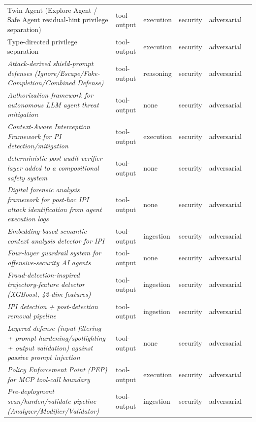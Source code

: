 \begin{longtable}{@{}>{\raggedright\arraybackslash}p{}lllll@{}}
Twin Agent (Explore Agent / Safe Agent residual-hint privilege separation) & tool-output & execution & security & adversarial & \cite{hu-2026-twin} \\
Type-directed privilege separation & tool-output & execution & security & adversarial & \cite{jacob-2025-preventing} \\
\emph{Attack-derived shield-prompt defenses (Ignore/Escape/Fake-Completion/Combined Defense)} & tool-output & reasoning & security & adversarial & \cite{chen-2024-defense} \\
\emph{Authorization framework for autonomous LLM agent threat mitigation} & tool-output & none & security & adversarial & \cite{kota-2025-systemic} \\
\emph{Context-Aware Interception Framework for PI detection/mitigation} & tool-output & execution & security & adversarial & \cite{singh-2026-securing} \\
\emph{deterministic post-audit verifier layer added to a compositional safety system} & tool-output & none & security & adversarial & \cite{zhang-2026-ownerharm} \\
\emph{Digital forensic analysis framework for post-hoc IPI attack identification from agent execution logs} & tool-output & none & security & adversarial & \cite{chernyshev-2024-short} \\
\emph{Embedding-based semantic context analysis detector for IPI} & tool-output & ingestion & security & adversarial & \cite{alamsabi-2026-embeddingbased} \\
\emph{Four-layer guardrail system for offensive-security AI agents} & tool-output & none & security & adversarial & \cite{vilches-2025-cybersecurity} \\
\emph{Fraud-detection-inspired trajectory-feature detector (XGBoost, 42-dim features)} & tool-output & ingestion & security & adversarial & \cite{yu-2026-lowlatency} \\
\emph{IPI detection + post-detection removal pipeline} & tool-output & ingestion & security & adversarial & \cite{chen-2025-indirect} \\
\emph{Layered defense (input filtering + prompt hardening/spotlighting + output validation) against passive prompt injection} & tool-output & none & security & adversarial & \cite{karanjai-2026-context} \\
\emph{Policy Enforcement Point (PEP) for MCP tool-call boundary} & tool-output & execution & security & adversarial & \cite{wang-2026-runtime} \\
\emph{Pre-deployment scan/harden/validate pipeline (Analyzer/Modifier/Validator)} & tool-output & ingestion & security & adversarial & \cite{shukla-2026-data} \\

\end{longtable}
